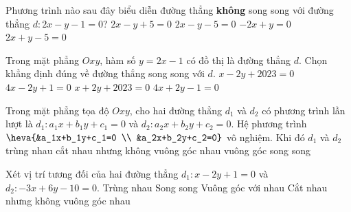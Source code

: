 

\begin{ex}%
	Phương trình nào sau đây biểu diễn đường  thẳng \textbf{không} song song với đường thẳng $d\colon 2x-y-1=0$?
	 \choice
		 {$2x-y+5=0$}
		 {$2x-y-5=0$}
		 {$-2x+y=0$}
		{\True  $2x+y-5=0$}
\end{ex}

\begin{ex}%
	Trong mặt phẳng $Oxy$, hàm số $y=2x-1$ có đồ thị là đường  thẳng $d$. Chọn khẳng định đúng về đường thẳng song song với $d$.
	 \choice
		 {$x-2y+2023=0$}
		{\True $4x-2y+1=0$} 
		{$x+2y+2023=0$} 
		 {$4x+2y-1=0$}
\end{ex}

\begin{ex}%
	Trong mặt phẳng tọa độ $Oxy$, cho hai đường thẳng $d_1$ và $d_2$ có phương trình lần lượt là $d_1 \colon a_1x+b_1y+c_1=0$ và $d_2 \colon a_2x+b_2y+c_2=0$. Hệ  phương trình $\heva{&a_1x+b_1y+c_1=0 \\ &a_2x+b_2y+c_2=0}$ vô nghiệm. Khi đó $d_1$ và $d_2$
	 \choice
		 {trùng nhau}
		{cắt  nhau nhưng không vuông góc nhau}
		{vuông góc} 
		 {\True song song}
\end{ex}

\begin{ex}%
	Xét  vị trí tương đối của hai đường thẳng $d_{1}\colon x-2y+1=0$ và $d_{2}\colon -3x+6y-10=0$.
	 \choice
		 {Trùng nhau}
		{\True Song  song}
		{Vuông góc  với nhau}
		{Cắt nhau nhưng không vuông  góc nhau}
\end{ex}

